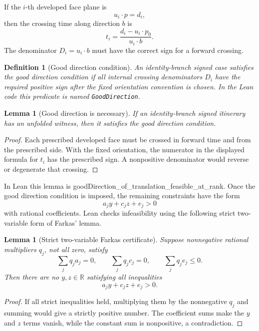 \documentclass[11pt]{article}
\newtheorem{lemma}[theorem]{Lemma}
\newtheorem{definition}[theorem]{Definition}
\newcommand{\R}{\mathbb{R}}
\newcommand{\dotp}{\mathbin{\cdot}}
\newcommand{\leanref}[1]{{\small\ttfamily #1}}
\begin{document}
If the \(i\)-th developed face plane is
\[
  u_i\dotp p=d_i,
\]
then the crossing time along direction \(b\) is
\[
  t_i=\frac{d_i-u_i\dotp p_0}{u_i\dotp b}.
\]
The denominator \(D_i=u_i\dotp b\) must have the correct sign for a forward
crossing.

\begin{definition}[Good direction condition]
An identity-branch signed case satisfies the \emph{good direction condition}
if all internal crossing denominators \(D_i\) have the required positive sign
after the fixed orientation convention is chosen.  In the Lean code this
predicate is named \texttt{GoodDirection}.
\end{definition}

\begin{lemma}[Good direction is necessary]
If an identity-branch signed itinerary has an unfolded witness, then it
satisfies the good direction condition.
\end{lemma}

\begin{proof}
Each prescribed developed face must be crossed in forward time and from the
prescribed side.  With the fixed orientation, the numerator in the displayed
formula for \(t_i\) has the prescribed sign.  A nonpositive denominator would
reverse or degenerate that crossing.
\end{proof}

In Lean this lemma is \leanref{goodDirection\_of\_translation\_feasible\_at\_rank}.
Once the good direction condition is imposed, the remaining constraints have
the form
\[
  a_jy+c_jz+e_j>0
\]
with rational coefficients.  Lean checks infeasibility using the following
strict two-variable form of Farkas' lemma.

\begin{lemma}[Strict two-variable Farkas certificate]
Suppose nonnegative rational multipliers \(q_j\), not all zero, satisfy
\[
  \sum_j q_ja_j=0,\qquad
  \sum_j q_jc_j=0,\qquad
  \sum_j q_je_j\le0.
\]
Then there are no \(y,z\in\R\) satisfying all inequalities
\[
  a_jy+c_jz+e_j>0.
\]
\end{lemma}

\begin{proof}
If all strict inequalities held, multiplying them by the nonnegative \(q_j\)
and summing would give a strictly positive number.  The coefficient sums make
the \(y\) and \(z\) terms vanish, while the constant sum is nonpositive, a
contradiction.
\end{proof}
\end{document}
